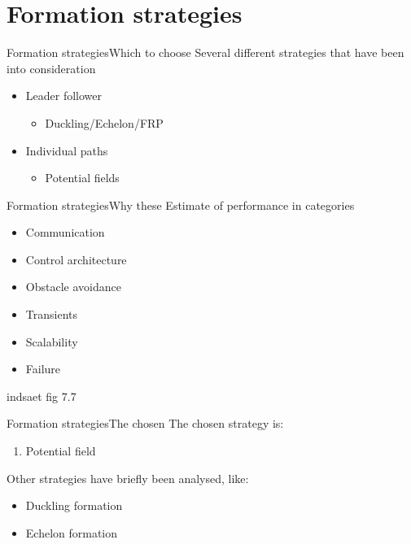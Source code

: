 \documentclass[10pt,handout]{beamer}
\begin{document}
\section{Formation strategies}

\begin{frame}{Formation strategies}{Which to choose}
Several different strategies that have been into consideration
  \begin{itemize}
    \item Leader follower
    \begin{itemize}
      \item Duckling/Echelon/FRP
    \end{itemize}
    \item Individual paths
    \begin{itemize}
      \item Potential fields
    \end{itemize}
   \end{itemize}
\end{frame}

\begin{frame}{Formation strategies}{Why these}
Estimate of performance in categories
\begin{itemize}
  \item Communication
  \item Control architecture
  \item Obstacle avoidance
  \item Transients
  \item Scalability
  \item Failure
\end{itemize}
indsaet fig 7.7
\end{frame}

\begin{frame}{Formation strategies}{The chosen}
The chosen strategy is:
\begin{enumerate}
  \item Potential field
\end{enumerate}
Other strategies have briefly been analysed, like:
\begin{itemize}
\item Duckling formation
\item Echelon formation
\end{itemize}
\end{frame}
\end{document}
